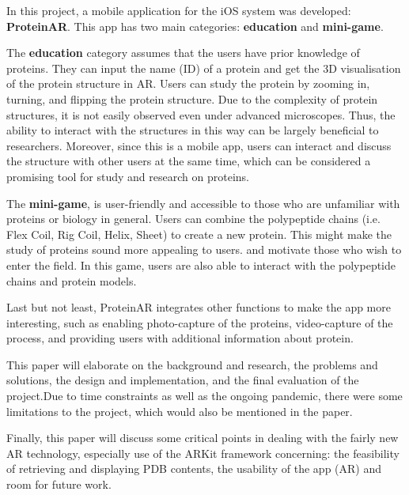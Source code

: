 In this project, a mobile application for the iOS system was developed: \textbf{ProteinAR}. This app has two main categories: \textbf{education} and \textbf{mini-game}. 

The \textbf{education} category assumes that the users have prior knowledge of proteins. They can input the name (ID) of a protein and get the 3D visualisation of the protein structure in AR. Users can study the protein by zooming in, turning, and flipping the protein structure. Due to the complexity of protein structures, it is not easily observed even under advanced microscopes. Thus, the ability to interact with the structures in this way can be largely beneficial to researchers. Moreover, since this is a mobile app, users can interact and discuss the structure with other users at the same time, which can be considered a promising tool for study and research on proteins.

The \textbf{mini-game}, is user-friendly and accessible to those who are unfamiliar with proteins or biology in general. Users can combine the polypeptide chains (i.e. Flex Coil, Rig Coil, Helix, Sheet) to create a new protein. This might make the study of proteins sound more appealing to users. and motivate those who wish to enter the field. In this game, users are also able to interact with the polypeptide chains and protein models. 

Last but not least, ProteinAR integrates other functions to make the app more interesting, such as enabling photo-capture of the proteins, video-capture of the process, and providing users with additional information about protein.

This paper will elaborate on the background and research, the problems and solutions, the design and implementation, and the final evaluation of the project.Due to time constraints as well as the ongoing pandemic, there were some limitations to the project, which would also be mentioned in the paper. 

Finally, this paper will discuss some critical points in dealing with the fairly new AR technology, especially use of the ARKit framework concerning: the feasibility of retrieving and displaying PDB contents, the usability of the app (AR) and room for future work.

